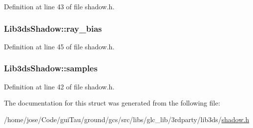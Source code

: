 Definition at line 43 of file shadow.\-h.

\hypertarget{struct_lib3ds_shadow_a625297876f28255eeb4b9c006533671b}{
\subsubsection[{ray\-\_\-bias}]{ Lib3ds\-Shadow\-::ray\-\_\-bias}}\label{struct_lib3ds_shadow_a625297876f28255eeb4b9c006533671b}


Definition at line 45 of file shadow.\-h.

\hypertarget{struct_lib3ds_shadow_a7e3f9dc76ba3ab1d1146ccf39b572af3}{
\subsubsection[{samples}]{ Lib3ds\-Shadow\-::samples}}\label{struct_lib3ds_shadow_a7e3f9dc76ba3ab1d1146ccf39b572af3}


Definition at line 42 of file shadow.\-h.



The documentation for this struct was generated from the following file\-:\begin{DoxyCompactItemize}
\item 
/home/jose/\-Code/gui\-Tau/ground/gcs/src/libs/glc\-\_\-lib/3rdparty/lib3ds/\hyperlink{shadow_8h}{shadow.\-h}\end{DoxyCompactItemize}
